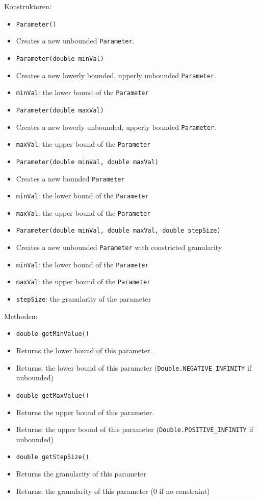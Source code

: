 \documentclass[parskip=full,11pt]{scrartcl}
\begin{document}
Konstruktoren:
\begin{itemize}\itemsep -10pt
	\item \texttt{Parameter()}
	\item[] Creates a new unbounded \texttt{Parameter}.
	
	\item \texttt{Parameter(double minVal)}
	\item[] Creates a new lowerly bounded, upperly unbounded \texttt{Parameter}.
	\item[] \texttt{minVal}: the lower bound of the \texttt{Parameter}
	\item \texttt{Parameter(double maxVal)}
	\item[] Creates a new lowerly unbounded, upperly bounded \texttt{Parameter}.
	\item[] \texttt{maxVal}: the upper bound of the \texttt{Parameter}
	\item \texttt{Parameter(double minVal, double maxVal)}
	\item[] Creates a new bounded \texttt{Parameter}
	\item[] \texttt{minVal}: the lower bound of the \texttt{Parameter}
	\item[] \texttt{maxVal}: the upper bound of the \texttt{Parameter}
	\item \texttt{Parameter(double minVal, double maxVal, double stepSize)}
	\item[] Creates a new unbounded \texttt{Parameter} with constricted granularity
\item[] \texttt{minVal}: the lower bound of the \texttt{Parameter}
	\item[] \texttt{maxVal}: the upper bound of the \texttt{Parameter}
	\item[] \texttt{stepSize}: the granularity of the parameter
	
\end{itemize}

Methoden:

\begin{itemize}\itemsep -10pt
	\item \texttt{double getMinValue()}
	\item[] Returns the lower bound of this parameter.
	\item[] Returns: the lower bound of this parameter (\texttt{Double.NEGATIVE\_INFINITY} if unbounded)
	\item \texttt{double getMaxValue()}
	\item[] Returns the upper bound of this parameter.
	\item[] Returns: the upper bound of this parameter (\texttt{Double.POSITIVE\_INFINITY} if unbounded)
	\item \texttt{double getStepSize()}
	\item[] Returns the granularity of this parameter
	\item[]Returns: the granularity of this parameter (\(0\) if no constraint)
\end{itemize}
\end{document}
